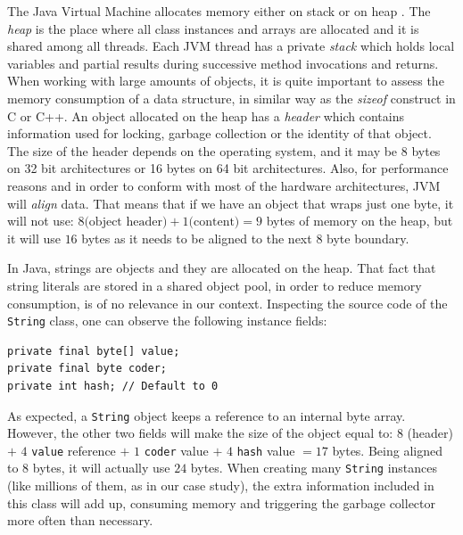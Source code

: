 \documentclass[a4paper,twoside]{article}
\begin{document}
The Java Virtual Machine allocates memory either on stack or on heap \cite{lindholm:2014}. 
The {\it heap} is the place where all class instances and arrays are allocated and it is shared among all threads. Each JVM thread has a private {\it stack} which holds local variables and partial results  during successive method invocations and returns. 
When working with large amounts of objects, it is quite important to assess the memory consumption of a data structure, in similar way as the {\it sizeof} construct in C or C++.
An object allocated on the heap has a {\it header} which contains information used for locking, garbage collection or the identity of that object. The size of the header depends on the operating system, and it may be 8 bytes on 32 bit architectures or 16 bytes on 64 bit architectures. 
Also, for performance reasons and in order to conform with most of the hardware architectures, JVM will {\it align} data.
That means that if we have an object that wraps just one byte, it will not use: $8 \text{(object header)} + 1 \text{(content)} = 9 $ bytes of memory on the heap, but it will use $16$ bytes as it needs to be aligned to the next $8$ byte boundary.

In Java, strings are objects and they are allocated on the heap. That fact that string literals are stored in a shared object pool, in order to reduce memory consumption, is of no relevance in our context.
Inspecting the source code of the \texttt{String} class, one can observe the following instance fields:
\begin{small}
\begin{verbatim}
private final byte[] value;
private final byte coder;
private int hash; // Default to 0
\end{verbatim}
\end{small}

As expected, a \texttt{String} object keeps a reference to an internal byte array. However, the other two fields will make the size of the object equal to: $8$ (header) $+$ $4$ \texttt{value} reference $+$ $1$  \texttt{coder} value $+$ $4$ \texttt{hash} value $= 17$ bytes. Being aligned to $8$ bytes, it will actually use $24$ bytes.
When creating many \texttt{String} instances (like millions of them, as in our case study), the extra information included in this class will add up, consuming memory and  triggering the garbage collector more often than necessary. 
\end{document}
